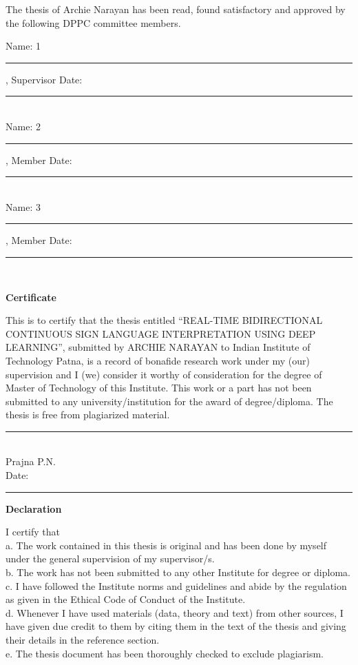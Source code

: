 \vspace{1cm}

The thesis of Archie Narayan has been read, found satisfactory and approved by the following DPPC committee members.

\vspace{1.5cm}

\noindent Name: 1\rule{5cm}{0.4pt}, Supervisor \hfill Date: \rule{4cm}{0.4pt}\\

\noindent Name: 2\rule{5cm}{0.4pt}, Member \hfill Date: \rule{4cm}{0.4pt}\\

\noindent Name: 3\rule{5cm}{0.4pt}, Member \hfill Date: \rule{4cm}{0.4pt}\\

\clearpage

\thispagestyle{empty}
\begin{center}
{\Large \bfseries Certificate}\\[1cm]
\end{center}

\noindent This is to certify that the thesis entitled ``REAL-TIME BIDIRECTIONAL CONTINUOUS SIGN LANGUAGE INTERPRETATION USING DEEP LEARNING'', submitted by ARCHIE NARAYAN to Indian Institute of Technology Patna, is a record of bonafide research work under my (our) supervision and I (we) consider it worthy of consideration for the degree of Master of Technology of this Institute. This work or a part has not been submitted to any university/institution for the award of degree/diploma. The thesis is free from plagiarized material.

\vspace{3cm}

\noindent \rule{5cm}{0.4pt} \\
Prajna P.N. \\
Date: \rule{3.2cm}{0.4pt}

\clearpage

\thispagestyle{empty}
\begin{center}
{\Large \bfseries Declaration}\\[1cm]
\end{center}

\noindent I certify that\\
a. The work contained in this thesis is original and has been done by myself under the general supervision of my supervisor/s.\\
b. The work has not been submitted to any other Institute for degree or diploma.\\
c. I have followed the Institute norms and guidelines and abide by the regulation as given in the Ethical Code of Conduct of the Institute.\\
d. Whenever I have used materials (data, theory and text) from other sources, I have given due credit to them by citing them in the text of the thesis and giving their details in the reference section.\\
e. The thesis document has been thoroughly checked to exclude plagiarism.

